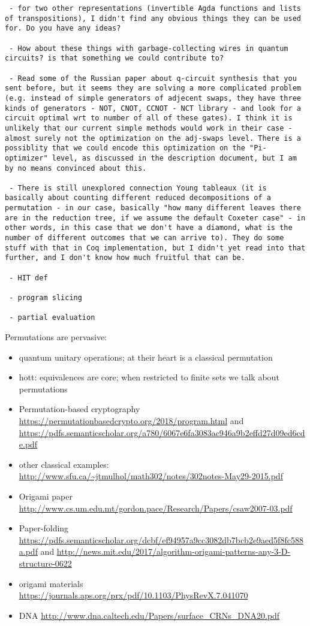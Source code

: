 \documentclass{article}
\begin{document}
\begin{verbatim}
 - for two other representations (invertible Agda functions and lists of transpositions), I didn't find any obvious things they can be used for. Do you have any ideas?

 - How about these things with garbage-collecting wires in quantum circuits? is that something we could contribute to? 

 - Read some of the Russian paper about q-circuit synthesis that you sent before, but it seems they are solving a more complicated problem (e.g. instead of simple generators of adjecent swaps, they have three kinds of generators - NOT, CNOT, CCNOT - NCT library - and look for a circuit optimal wrt to number of all of these gates). I think it is unlikely that our current simple methods would work in their case - almost surely not the optimization on the adj-swaps level. There is a possiblity that we could encode this optimization on the "Pi-optimizer" level, as discussed in the description document, but I am by no means convinced about this.

 - There is still unexplored connection Young tableaux (it is basically about counting different reduced decompositions of a permutation - in our case, basically "how many different leaves there are in the reduction tree, if we assume the default Coxeter case" - in other words, in this case that we don't have a diamond, what is the number of different outcomes that we can arrive to). They do some stuff with that in Coq implementation, but I didn't yet read into that further, and I don't know how much fruitful that can be.  

 - HIT def

 - program slicing

 - partial evaluation

 \end{verbatim}

Permutations are pervasive:

\begin{itemize}
  \item quantum unitary operations; at their heart is a classical permutation
  \item hott: equivalences are core; when restricted to finite sets we talk about permutations
  \item Permutation-based cryptography \url{https://permutationbasedcrypto.org/2018/program.html} and \url{https://pdfs.semanticscholar.org/a780/6067e6fa3083ac946a9b2effd27d09ed6cde.pdf}
  \item other classical examples: \url{http://www.sfu.ca/~jtmulhol/math302/notes/302notes-May29-2015.pdf}
\item Origami paper \url{http://www.cs.um.edu.mt/gordon.pace/Research/Papers/csaw2007-03.pdf}
  \item Paper-folding \url{https://pdfs.semanticscholar.org/dcbf/ef94957a9cc3082db7bcb2e9aed5f8fc588a.pdf} and \url{http://news.mit.edu/2017/algorithm-origami-patterns-any-3-D-structure-0622}
  \item origami materials \url{https://journals.aps.org/prx/pdf/10.1103/PhysRevX.7.041070}
  \item DNA \url{http://www.dna.caltech.edu/Papers/surface_CRNs_DNA20.pdf}
\end{itemize}
\end{document}
